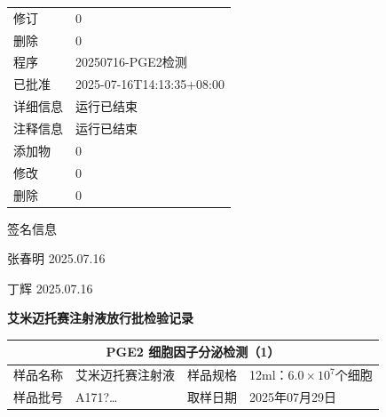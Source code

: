 \documentclass[UTF8,10pt,a4paper,fontset=fandol]{ctexart}
\newcommand{\fieldvalue}[1]{#1}
\newcommand{\handwritten}[1]{#1}
\begin{document}
\medskip
\noindent
\begin{tabular}{ll}
修订 &
\fieldvalue{0} \\

删除 &
\fieldvalue{0} \\

程序 &
\fieldvalue{20250716-PGE2检测} \\

已批准 &
\fieldvalue{2025-07-16T14:13:35+08:00} \\

详细信息 &
\fieldvalue{运行已结束} \\

注释信息 &
\fieldvalue{运行已结束} \\

添加物 &
\fieldvalue{0} \\

修改 &
\fieldvalue{0} \\

删除 &
\fieldvalue{0}
\end{tabular}

\medskip
签名信息

\vfill

\handwritten{张春明}\quad
\handwritten{2025.07.16}

\medskip

\handwritten{丁辉}\quad
\handwritten{2025.07.16}

\newpage

\begin{center}
\textbf{艾米迈托赛注射液放行批检验记录}
\end{center}

\begin{tabularx}{\textwidth}{|l|X|l|X|}
\hline
\multicolumn{4}{|c|}{PGE2 细胞因子分泌检测（1）} \\ \hline
样品名称 &
\fieldvalue{艾米迈托赛注射液} &
样品规格 &
\fieldvalue{12ml：$6.0\times10^{7}$个细胞} \\ \hline
样品批号 &
\fieldvalue{\handwritten{A171?…}} &
取样日期 &
\fieldvalue{\handwritten{2025年07月29日}} \\ \hline
\end{tabularx}
\end{document}
